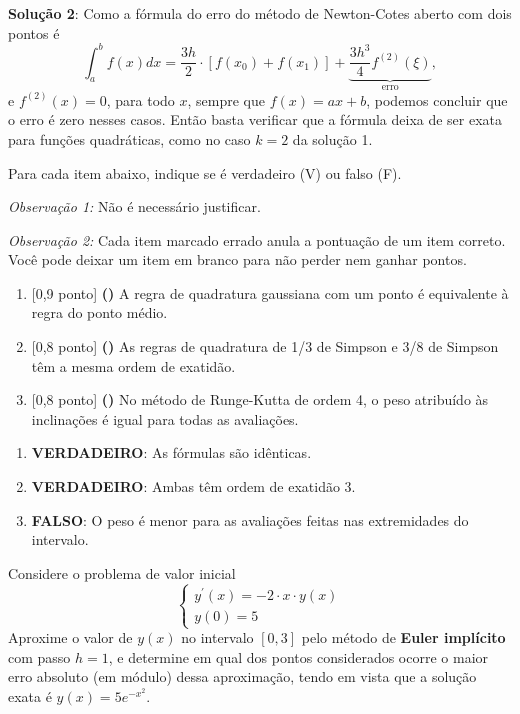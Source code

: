 \documentclass[12pt,a4paper]{article}
\begin{document}
\begin{ExerciseList}
\textbf{Solução 2}: Como a fórmula do erro do método de Newton-Cotes aberto com dois pontos é 
\[
\int_a^b f(x) dx = \frac{3h}{2} \cdot \left[ f(x_0) + f(x_1) \right]
+ \underbrace{\frac{3h^3}{4} f^{(2)}(\xi)}_{\text{erro}},
\]
e $f^{(2)}(x) = 0$, para todo $x$, sempre que $f(x) = ax + b$, podemos concluir que o erro é zero nesses casos. Então basta verificar que a fórmula deixa de ser exata para funções quadráticas, como no caso $k=2$ da solução 1.


\Exercise[title={2,5}] Para cada item abaixo, indique se é verdadeiro (V) ou falso (F).

\emph{Observação 1:} Não é necessário justificar.

\emph{Observação 2:} Cada item marcado errado anula a pontuação de um item correto. Você pode deixar um item em branco para não perder nem ganhar pontos.

\begin{enumerate}
    \item {[0,9 ponto] \bf (\hspace{.7em})} A regra de quadratura gaussiana com um ponto é equivalente à regra do ponto médio.
    \item {[0,8 ponto] \bf (\hspace{.7em})} As regras de quadratura de 1/3 de Simpson e 3/8 de Simpson têm a mesma ordem de exatidão.
    \item {[0,8 ponto] \bf (\hspace{.7em})} No método de Runge-Kutta de ordem 4, o peso atribuído às inclinações é igual para todas as avaliações.
\end{enumerate}

\Answer
\begin{enumerate}
    \item \textbf{VERDADEIRO}: As fórmulas são idênticas.
    \item \textbf{VERDADEIRO}: Ambas têm ordem de exatidão $3$.
    \item \textbf{FALSO}: O peso é menor para as avaliações feitas nas extremidades do intervalo.
\end{enumerate}

\Exercise[title={2,5}] Considere o problema de valor inicial
\[
\begin{cases}
y^\prime(x) = -2 \cdot x \cdot y(x)\\
y(0) = 5
\end{cases}
\]
Aproxime o valor de $y(x)$ no intervalo $[0, 3]$ pelo método de \textbf{Euler implícito} com passo $h = 1$, e determine em qual dos pontos considerados ocorre o maior erro absoluto (em módulo) dessa aproximação, tendo em vista que a solução exata é $y(x)=5e^{-x^2}$.


\end{ExerciseList}
\end{document}
